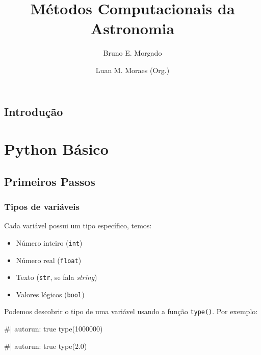 \documentclass[
  letterpaper,
  DIV=11,
  numbers=noendperiod]{scrreprt}
\title{Métodos Computacionais da Astronomia}
\author{Bruno E. Morgado \and Luan M. Moraes (Org.)}
\date{}
\newenvironment{Shaded}{\begin{snugshade}}{\end{snugshade}}
\newcommand{\NormalTok}[1]{\textcolor[rgb]{0.00,0.23,0.31}{#1}}
\providecommand{\tightlist}{%
  \setlength{\itemsep}{0pt}\setlength{\parskip}{0pt}}
\renewcommand*\contentsname{Table of contents}
\newcommand\contentsname{Table of contents}
\begin{document}
\maketitle

\renewcommand*\contentsname{Table of contents}
{
\setcounter{tocdepth}{2}
\tableofcontents
}


\chapter*{Introdução}\label{introduuxe7uxe3o}


\part{Python Básico}

\chapter{Primeiros Passos}\label{primeiros-passos}

\section{Tipos de variáveis}\label{tipos-de-variuxe1veis}

Cada variável possui um tipo específico, temos:

\begin{itemize}
\tightlist
\item
  Número inteiro (\texttt{int})
\item
  Número real (\texttt{float})
\item
  Texto (\texttt{str}, se fala \emph{string})
\item
  Valores lógicos (\texttt{bool})
\end{itemize}

Podemos descobrir o tipo de uma variável usando a função
\texttt{type()}. Por exemplo:

\begin{Shaded}
\begin{Highlighting}[]
\NormalTok{\#| autorun: true}
\NormalTok{type(1000000)}
\end{Highlighting}
\end{Shaded}

\begin{Shaded}
\begin{Highlighting}[]
\NormalTok{\#| autorun: true}
\NormalTok{type(2.0)}
\end{Highlighting}
\end{Shaded}
\end{document}

